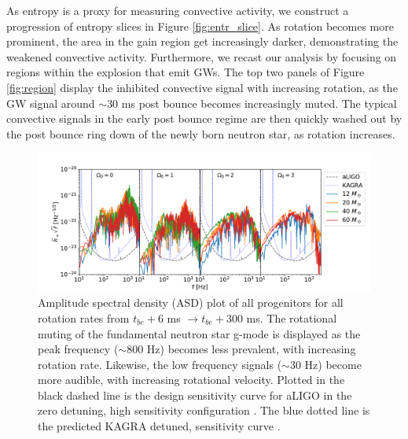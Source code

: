 \documentclass[twocolumn,times]{aastex62}  %
\begin{document}
 As entropy is a proxy for measuring convective activity, we construct a progression of entropy slices in Figure \ref{fig:entr_slice}.  As rotation becomes more prominent, the area in the gain region get increasingly darker, demonstrating the weakened convective activity.  Furthermore, we recast our analysis by focusing on regions within the explosion that emit GWs.  The top two panels of Figure \ref{fig:region} display the inhibited convective signal with increasing rotation, as the GW signal around $\sim$30 ms post bounce becomes increasingly muted.  The typical convective signals in the early post bounce regime are then quickly washed out by the post bounce ring down of the newly born neutron star, as rotation increases.   
\begin{figure}[t!]
  \centering     %
  \includegraphics[width=\textwidth]{figures/tbe6tbe300_M1_long.pdf}
  \caption{Amplitude spectral density (ASD) plot of all progenitors for all rotation rates from $t_{be}+6$ ms $\rightarrow t_{be}+300$ ms.  The rotational muting of the fundamental neutron star g-mode is displayed as the peak frequency ($\sim 800$ Hz) becomes less prevalent, with increasing rotation rate.  Likewise, the low frequency signals ($\sim30$ Hz) become more audible, with increasing rotational velocity.  Plotted in the black dashed line is the design sensitivity curve for aLIGO in the zero detuning, high sensitivity configuration \citep{barsotti:2018}.  The blue dotted line is the predicted KAGRA detuned, sensitivity curve \citep{komari:2017}.}
  \label{fig:spetra_long}
\end{figure}
\end{document}

